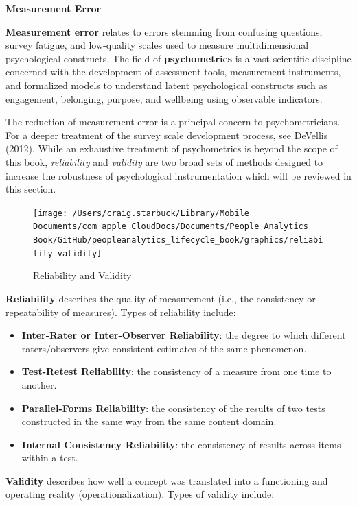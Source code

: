 \documentclass[]{book}
\providecommand{\tightlist}{%
  \setlength{\itemsep}{0pt}\setlength{\parskip}{0pt}}
\begin{document}
\textbf{Measurement Error}

\textbf{Measurement error} relates to errors stemming from confusing questions, survey fatigue, and low-quality scales used to measure multidimensional psychological constructs. The field of \textbf{psychometrics} is a vast scientific discipline concerned with the development of assessment tools, measurement instruments, and formalized models to understand latent psychological constructs such as engagement, belonging, purpose, and wellbeing using observable indicators.

The reduction of measurement error is a principal concern to psychometricians. For a deeper treatment of the survey scale development process, see DeVellis (2012). While an exhaustive treatment of psychometrics is beyond the scope of this book, \emph{reliability} and \emph{validity} are two broad sets of methods designed to increase the robustness of psychological instrumentation which will be reviewed in this section.

\begin{figure}

{\centering \texttt{[image: /Users/craig.starbuck/Library/Mobile Documents/com~apple~CloudDocs/Documents/People Analytics Book/GitHub/peopleanalytics\_lifecycle\_book/graphics/reliability\_validity]} 

}

\caption{Reliability and Validity}\label{fig:reli-vali}
\end{figure}

\textbf{Reliability} describes the quality of measurement (i.e., the consistency or repeatability of measures). Types of reliability include:

\begin{itemize}
\tightlist
\item
  \textbf{Inter-Rater or Inter-Observer Reliability}: the degree to which different raters/observers give consistent estimates of the same phenomenon.
\item
  \textbf{Test-Retest Reliability}: the consistency of a measure from one time to another.
\item
  \textbf{Parallel-Forms Reliability}: the consistency of the results of two tests constructed in the same way from the same content domain.
\item
  \textbf{Internal Consistency Reliability}: the consistency of results across items within a test.
\end{itemize}

\textbf{Validity} describes how well a concept was translated into a functioning and operating reality (operationalization). Types of validity include:
\end{document}
